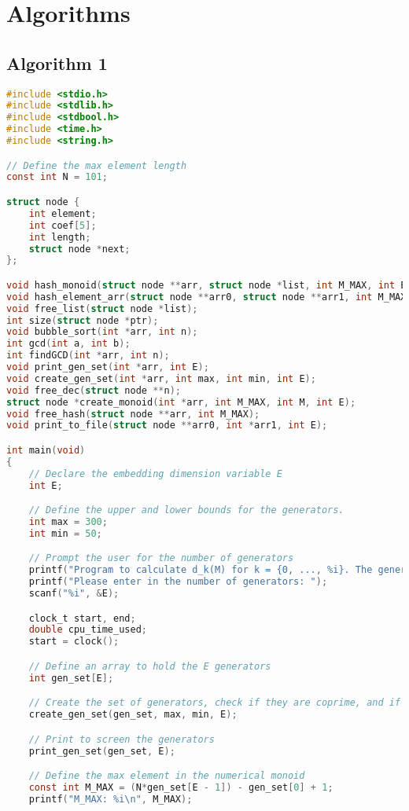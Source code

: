 \chapter{Algorithms}

\section{Algorithm 1}

\begin{lstlisting}[language=C]  
#include <stdio.h>
#include <stdlib.h>
#include <stdbool.h>
#include <time.h>
#include <string.h>

// Define the max element length
const int N = 101;

struct node {
    int element;
    int coef[5];
    int length;
    struct node *next;
};

void hash_monoid(struct node **arr, struct node *list, int M_MAX, int E);
void hash_element_arr(struct node **arr0, struct node **arr1, int M_MAX);
void free_list(struct node *list);
int size(struct node *ptr);
void bubble_sort(int *arr, int n);
int gcd(int a, int b);
int findGCD(int *arr, int n);
void print_gen_set(int *arr, int E);
void create_gen_set(int *arr, int max, int min, int E);
void free_dec(struct node **n);
struct node *create_monoid(int *arr, int M_MAX, int M, int E);
void free_hash(struct node **arr, int M_MAX);
void print_to_file(struct node **arr0, int *arr1, int E);

int main(void)
{
    // Declare the embedding dimension variable E
    int E;

    // Define the upper and lower bounds for the generators.
    int max = 300;
    int min = 50;

    // Prompt the user for the number of generators
    printf("Program to calculate d_k(M) for k = {0, ..., %i}. The generators will be between %i and %i inclusive.\n", N - 1, min, max);
    printf("Please enter in the number of generators: ");
    scanf("%i", &E);

    clock_t start, end;
    double cpu_time_used;
    start = clock();

    // Define an array to hold the E generators
    int gen_set[E];

    // Create the set of generators, check if they are coprime, and if they are not, divide by the gcd.
    create_gen_set(gen_set, max, min, E);

    // Print to screen the generators
    print_gen_set(gen_set, E);

    // Define the max element in the numerical monoid
    const int M_MAX = (N*gen_set[E - 1]) - gen_set[0] + 1;
    printf("M_MAX: %i\n", M_MAX);


\end{lstlisting}
